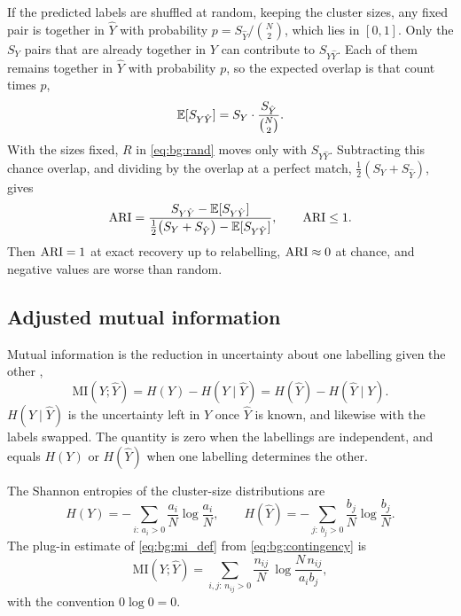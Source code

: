 If the predicted labels are shuffled at random, keeping the cluster sizes, any fixed pair is together in $\hat{Y}$ with probability $p=S_{\hat{Y}}/\binom{N}{2}$, which lies in $[0,1]$.
Only the $S_Y$ pairs that are already together in $Y$ can contribute to $S_{Y\hat{Y}}$.
Each of them remains together in $\hat{Y}$ with probability $p$, so the expected overlap is that count times $p$,
\begin{equation}\label{eq:bg:ari_expected}
  \mathbb{E}[S_{Y\hat{Y}}]
  =
  S_Y \cdot \frac{S_{\hat{Y}}}{\binom{N}{2}}.
\end{equation}
With the sizes fixed, $R$ in \cref{eq:bg:rand} moves only with $S_{Y\hat{Y}}$.
Subtracting this chance overlap, and dividing by the overlap at a perfect match, $\tfrac12(S_Y+S_{\hat{Y}})$, gives \parencite{hubert1985comparing}
\begin{equation}\label{eq:bg:ari}
  \mathrm{ARI}
  =
  \frac{S_{Y\hat{Y}}-\mathbb{E}[S_{Y\hat{Y}}]}{\tfrac{1}{2}\bigl(S_Y+S_{\hat{Y}}\bigr)-\mathbb{E}[S_{Y\hat{Y}}]},
  \qquad
  \mathrm{ARI}\le 1.
\end{equation}
Then $\mathrm{ARI}=1$ at exact recovery up to relabelling, $\mathrm{ARI}\approx 0$ at chance, and negative values are worse than random.

\subsection*{Adjusted mutual information}

Mutual information is the reduction in uncertainty about one labelling given the other \parencite{vinh2010information},
\begin{equation}\label{eq:bg:mi_def}
  \mathrm{MI}(Y;\hat{Y})
  =
  H(Y)-H(Y\mid\hat{Y})
  =
  H(\hat{Y})-H(\hat{Y}\mid Y).
\end{equation}
$H(Y\mid\hat{Y})$ is the uncertainty left in $Y$ once $\hat{Y}$ is known, and likewise with the labels swapped.
The quantity is zero when the labellings are independent, and equals $H(Y)$ or $H(\hat{Y})$ when one labelling determines the other.

The Shannon entropies of the cluster-size distributions are
\begin{equation}\label{eq:bg:entropy_marginals}
  H(Y)=-\sum_{i:\,a_i>0}\frac{a_i}{N}\log\frac{a_i}{N},
  \qquad
  H(\hat{Y})=-\sum_{j:\,b_j>0}\frac{b_j}{N}\log\frac{b_j}{N}.
\end{equation}
The plug-in estimate of \cref{eq:bg:mi_def} from \cref{eq:bg:contingency} is
\begin{equation}\label{eq:bg:mi}
  \mathrm{MI}(Y;\hat{Y})
  =
  \sum_{i,j:\,n_{ij}>0}\frac{n_{ij}}{N}\,
  \log\frac{N\,n_{ij}}{a_i b_j},
\end{equation}
with the convention $0\log 0=0$.

